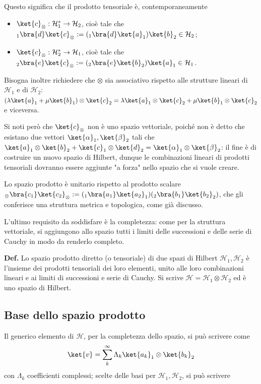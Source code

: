 Questo significa che il prodotto tensoriale è, contemporaneamente
\begin{itemize}
    \item $\ket{c}_\otimes: \mathcal{H}_1^*\to\mathcal{H}_2$, cioè tale che
	$_1\bra{d}\ket{c}_\otimes := ({}_1\bra{d}\ket{a}_1)\ket{b}_2\in\mathcal{H}_2$;
    \item $\ket{c}_\otimes: \mathcal{H}_2^*\to\mathcal{H}_1$, cioè tale che
	$_2\bra{e}\ket{c}_\otimes := (_2\bra{e}\ket{b}_2)\ket{a}_1\in\mathcal{H}_1$.
\end{itemize}

Bisogna inoltre richiedere che $\otimes$ sia associativo rispetto alle strutture
lineari di $\mathcal{H}_1$ e di $\mathcal{H}_2$:
$(\lambda\ket{a}_1 + \mu\ket{b}_1)\otimes\ket{c}_2 =
\lambda\ket{a}_1\otimes\ket{c}_2 + \mu\ket{b}_1\otimes\ket{c}_2$ e viceversa.

Si noti però che ${\ket{c}_\otimes}$ non è uno spazio vettoriale, poiché non è detto
che esistano due vettori $\ket{\alpha}_1,\ket{\beta}_2$ tali che
$\ket{a}_1\otimes\ket{b}_2 + \ket{c}_1\otimes\ket{d}_2 =
\ket{\alpha}_1\otimes\ket{\beta}_2$: il fine è di costruire un nuovo spazio di
Hilbert, dunque le combinazioni lineari di prodotti tensoriali dovranno essere 
aggiunte "a forza" nello spazio che si vuole creare.

Lo spazio prodotto è unitario rispetto al prodotto scalare
$_\otimes\bra{c_1}\ket{c_2}_\otimes :=
(_1\bra{a_1}\ket{a_2}_1) (_2\bra{b_1}\ket{b_2}_2)$, che gli conferisce una struttura
metrica e topologica, come già discusso.

L'ultimo requisito da soddisfare è la completezza: come per la struttura vettoriale,
si aggiungono allo spazio tutti i limiti delle successioni e delle serie di Cauchy 
in modo da renderlo completo.

\textbf{Def.} Lo spazio prodotto diretto (o tensoriale) di due spazi di Hilbert 
$\mathcal{H}_1,\mathcal{H}_2$ è l'insieme dei prodotti tensoriali dei loro elementi,
unito alle loro combinazioni lineari e ai limiti di successioni e serie di Cauchy.
Si scrive $\mathcal{H}=\mathcal{H}_1\otimes\mathcal{H}_2$ ed è uno spazio di Hilbert.
\subsection{Base dello spazio prodotto}
Il generico elemento di $\mathcal{H}$, per la completezza dello spazio, si può
scrivere come
$$\ket{v}=\sum_{k}^{\infty} \Lambda_k\ket{a_k}_1\otimes\ket{b_k}_2$$
con $\Lambda_k$ coefficienti complessi; scelte delle basi per $\mathcal{H}_1
,\mathcal{H}_2$, si può scrivere

